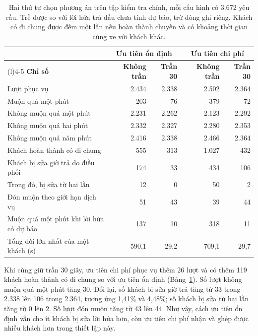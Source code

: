 \begin{table}[htbp]
\centering
\caption[Đánh đổi dưới hai thứ tự chọn phương án]{Hai thứ tự chọn phương án trên tập kiểm tra chính, mỗi cấu hình
có 3.672 yêu cầu. Trễ được so với lời hứa trả đầu chưa tính dự báo, trừ dòng ghi riêng. Khách có đi chung được
đếm một lần nếu hoàn thành chuyến và có khoảng thời gian cùng xe với khách khác.}
\label{bang:c4-doi-uutien}
\small
\setlength{\tabcolsep}{3pt}
\begin{tabular}{@{}>{\raggedright\arraybackslash}p{6.5cm}rrrr@{}}
\toprule
& \multicolumn{2}{c}{\textbf{Ưu tiên ổn định}} & \multicolumn{2}{c}{\textbf{Ưu tiên chi phí}}\\
\cmidrule(lr){2-3}\cmidrule(l){4-5}
\textbf{Chỉ số} & \textbf{Không trần} & \textbf{Trần 30} & \textbf{Không trần} & \textbf{Trần 30}\\
\midrule
Lượt phục vụ & 2.434 & 2.338 & 2.502 & 2.364\\
Muộn quá một phút & 203 & 76 & 379 & 72\\
Không muộn quá một phút & 2.231 & 2.262 & 2.123 & 2.292\\
Không muộn quá hai phút & 2.332 & 2.327 & 2.280 & 2.353\\
Không muộn quá năm phút & 2.416 & 2.338 & 2.466 & 2.364\\
Khách hoàn thành có đi chung & 555 & 313 & 1.027 & 432\\
Khách bị sửa giờ trả do điều phối & 174 & 33 & 434 & 106\\
Trong đó, bị sửa từ hai lần & 12 & 0 & 50 & 2\\
Đón muộn theo giới hạn dịch vụ & 51 & 43 & 39 & 44\\
Muộn quá một phút khi lời hứa có dự báo & 137 & 10 & 318 & 11\\
Tổng dời lớn nhất của một khách (s) & 590,1 & 29,2 & 709,1 & 29,7\\
\bottomrule
\end{tabular}
\end{table}

Khi cùng giữ trần 30 giây, ưu tiên chi phí phục vụ thêm 26 lượt và có thêm 119 khách hoàn thành có đi chung
so với ưu tiên ổn định (Bảng~\ref{bang:c4-doi-uutien}). Số lượt không muộn quá một phút tăng 30. Đổi lại, số khách
bị sửa giờ trả tăng từ 33 trong 2.338 lên 106 trong 2.364, tương ứng 1,41\% và 4,48\%; số khách bị sửa từ hai lần
tăng từ 0 lên 2. Số lượt đón muộn tăng từ 43 lên 44. Như vậy, cách ưu tiên ổn định vẫn cho ít khách bị sửa lời
hứa hơn, còn ưu tiên chi phí nhận và ghép được nhiều khách hơn trong thiết lập này.

